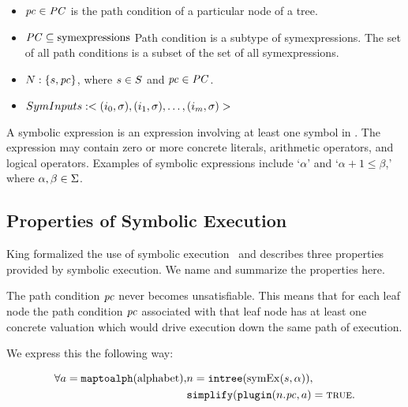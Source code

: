 \begin{itemize}
\item $\mathit{pc} \in \mathit{PC}$ is the path condition of a particular node of a tree.
\item $\mathit{PC} \subseteq \mathrm{symexpressions}$ Path condition is a subtype of
  symexpressions. The set of all path conditions is a subset of the set of all
  symexpressions.
\item $N: \{s,\mathit{pc}\}$, where $s \in S$
  and $\mathit{pc} \in \mathit{PC}$.
\item $SymInputs: <(i_0, \sigma), (i_1,
  \sigma), \ldots, (i_m, \sigma)>$
\end{itemize}

A symbolic expression \symexpression{} is an expression involving at least one
symbol in \symalphabet. The expression may contain zero or more concrete
literals, arithmetic operators, and logical operators. Examples of
symbolic expressions include `$\alpha$' and `$\alpha + 1 \le \beta$,' where $\alpha,
\beta \in \Sigma$.



\subsection{Properties of Symbolic Execution}
King formalized the use of symbolic execution~\cite{king1976symbolic} and describes three
properties provided by symbolic execution. We name and summarize the properties
here.
\setcounter{property}{0}
\renewcommand{\theproperty}{K.\arabic{property}}
\begin{property}
  \label{prop:kingsound}
  The path condition $\mathit{pc}$ never becomes unsatisfiable. This means that for each
  leaf node the path condition $\mathit{pc}$ associated with that leaf node has at
  least one concrete valuation which would drive execution down the same path of
  execution.
  
  We express this the following way: 
  
  \begin{align*}
  \forall a = \mathtt{maptoalph}(\mathrm{alphabet}), & n =
\mathtt{intree}(\mathrm{symEx}(s,\alpha)), \\
 & \mathtt{simplify}(\mathtt{plugin}(n.\mathit{pc},a) = \mathtt{\textsc{true}}.
  \end{align*}
  
\end{property}


